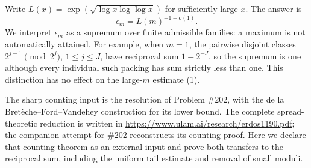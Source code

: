 Write $L(x)=\exp(\sqrt{\log x\log\log x})$ for sufficiently large $x$. The answer is
\[
 \epsilon_m=L(m)^{-1+o(1)}.
\tag{1}
\]
We interpret $\epsilon_m$ as a supremum over finite admissible families: a maximum is not automatically attained. For example, when $m=1$, the pairwise disjoint classes $2^{j-1}\pmod{2^j}$, $1\le j\le J$, have reciprocal sum $1-2^{-J}$, so the supremum is one although every individual such packing has sum strictly less than one. This distinction has no effect on the large-$m$ estimate (1).

The sharp counting input is the resolution of Problem \#202, with the de la Bret\`eche--Ford--Vandehey construction for its lower bound. The complete spread-theoretic reduction is written in \url{https://www.ulam.ai/research/erdos1190.pdf}; the companion attempt for \#202 reconstructs its counting proof. Here we declare that counting theorem as an external input and prove both transfers to the reciprocal sum, including the uniform tail estimate and removal of small moduli.
